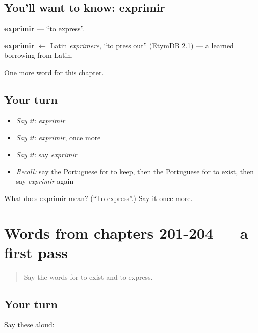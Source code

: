 \subsection*{You'll want to know: exprimir}
\textbf{exprimir} — \textquotedblleft{}to express\textquotedblright{}.

\begin{cousinweb}
\textbf{exprimir} $\leftarrow$ Latin \emph{exprimere}, \textquotedblleft{}to press out\textquotedblright{} (EtymDB 2.1) — a learned borrowing from Latin.
\end{cousinweb}

\begin{grammarlens}[title={What you've built}]
One more word for this chapter.
\end{grammarlens}

\subsection*{Your turn}
\begin{itemize}
\raggedright
  \item \emph{Say it:} \emph{exprimir}
  \item \emph{Say it:} \emph{exprimir}, once more
  \item \emph{Say it:} say \emph{exprimir}
  \item \emph{Recall:} say the Portuguese for to keep, then the Portuguese for to exist, then say \emph{exprimir} again
\end{itemize}

\begin{tcolorbox}[breakable,colback=teal!4,colframe=teal!35!black,title={Before you move on}]
What does exprimir mean? (\textquotedblleft{}To express\textquotedblright{}.) Say it once more.
\end{tcolorbox}
\section[(dialogue)]{Words from chapters 201-204 — a first pass}

\label{lesson:PT-R209-first-pass-words-from-chapters-201-204}



\begin{quote}
Say the words for to exist and to express.
\end{quote}

\subsection*{Your turn}
Say these aloud:

